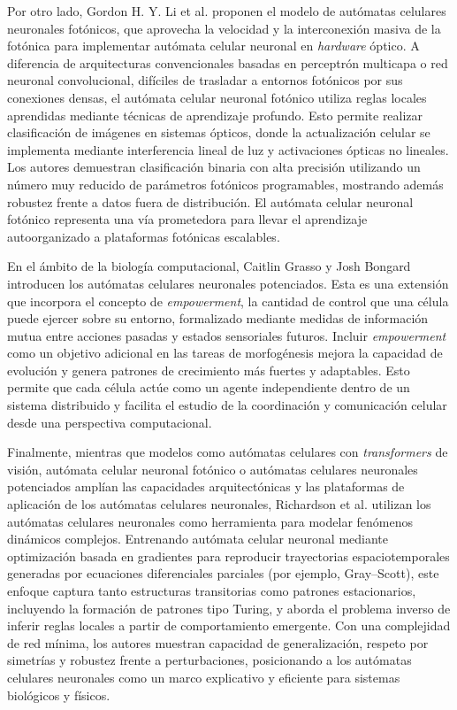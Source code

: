 Por otro lado, Gordon H. Y. Li et al. \cite{li2024_pnca} proponen el modelo de autómatas celulares neuronales fotónicos, que aprovecha la velocidad y la interconexión masiva de la fotónica para implementar autómata celular neuronal en \textit{hardware} óptico. A diferencia de arquitecturas convencionales basadas en perceptrón multicapa o red neuronal convolucional, difíciles de trasladar a entornos fotónicos por sus conexiones densas, el autómata celular neuronal fotónico utiliza reglas locales aprendidas mediante técnicas de aprendizaje profundo. Esto permite realizar clasificación de imágenes en sistemas ópticos, donde la actualización celular se implementa mediante interferencia lineal de luz y activaciones ópticas no lineales. Los autores demuestran clasificación binaria con alta precisión utilizando un número muy reducido de parámetros fotónicos programables, mostrando además robustez frente a datos fuera de distribución. El autómata celular neuronal fotónico representa una vía prometedora para llevar el aprendizaje autoorganizado a plataformas fotónicas escalables.

En el ámbito de la biología computacional, Caitlin Grasso y Josh Bongard \cite{grasso2022_enca} introducen los autómatas celulares neuronales potenciados. Esta es una extensión que incorpora el concepto de \textit{empowerment}, la cantidad de control que una célula puede ejercer sobre su entorno, formalizado mediante medidas de información mutua entre acciones pasadas y estados sensoriales futuros. Incluir \textit{empowerment} como un objetivo adicional en las tareas de morfogénesis mejora la capacidad de evolución y genera patrones de crecimiento más fuertes y adaptables. Esto permite que cada célula actúe como un agente independiente dentro de un sistema distribuido y facilita el estudio de la coordinación y comunicación celular desde una perspectiva computacional.

Finalmente, mientras que modelos como autómatas celulares con \textit{transformers} de visión, autómata celular neuronal fotónico o autómatas celulares neuronales potenciados amplían las capacidades arquitectónicas y las plataformas de aplicación de los autómatas celulares neuronales, Richardson et al. \cite{richardson2024_nca} utilizan los autómatas celulares neuronales como herramienta para modelar fenómenos dinámicos complejos. Entrenando autómata celular neuronal mediante optimización basada en gradientes para reproducir trayectorias espaciotemporales generadas por ecuaciones diferenciales parciales (por ejemplo, Gray–Scott), este enfoque captura tanto estructuras transitorias como patrones estacionarios, incluyendo la formación de patrones tipo Turing, y aborda el problema inverso de inferir reglas locales a partir de comportamiento emergente. Con una complejidad de red mínima, los autores muestran capacidad de generalización, respeto por simetrías y robustez frente a perturbaciones, posicionando a los autómatas celulares neuronales como un marco explicativo y eficiente para sistemas biológicos y físicos.

